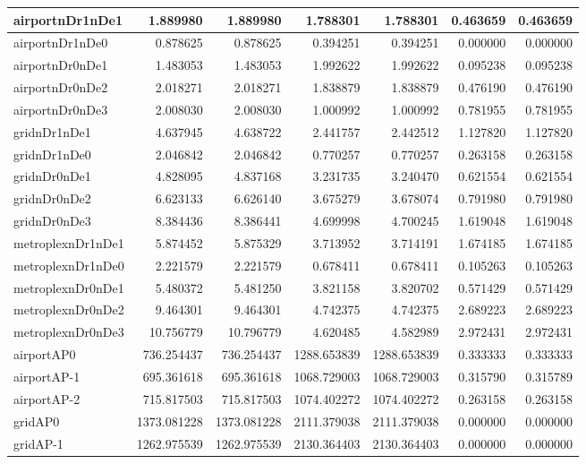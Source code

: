 \begin{longtable}{|l|r|r|r|r|r|r|}
\endlastfoot
airportnDr1nDe1 & 1.889980 & 1.889980 & 1.788301 & 1.788301 & 0.463659 & 0.463659 \\ \hline
airportnDr1nDe0 & 0.878625 & 0.878625 & 0.394251 & 0.394251 & 0.000000 & 0.000000 \\ \hline
airportnDr0nDe1 & 1.483053 & 1.483053 & 1.992622 & 1.992622 & 0.095238 & 0.095238 \\ \hline
airportnDr0nDe2 & 2.018271 & 2.018271 & 1.838879 & 1.838879 & 0.476190 & 0.476190 \\ \hline
airportnDr0nDe3 & 2.008030 & 2.008030 & 1.000992 & 1.000992 & 0.781955 & 0.781955 \\ \hline
gridnDr1nDe1 & 4.637945 & 4.638722 & 2.441757 & 2.442512 & 1.127820 & 1.127820 \\ \hline
gridnDr1nDe0 & 2.046842 & 2.046842 & 0.770257 & 0.770257 & 0.263158 & 0.263158 \\ \hline
gridnDr0nDe1 & 4.828095 & 4.837168 & 3.231735 & 3.240470 & 0.621554 & 0.621554 \\ \hline
gridnDr0nDe2 & 6.623133 & 6.626140 & 3.675279 & 3.678074 & 0.791980 & 0.791980 \\ \hline
gridnDr0nDe3 & 8.384436 & 8.386441 & 4.699998 & 4.700245 & 1.619048 & 1.619048 \\ \hline
metroplexnDr1nDe1 & 5.874452 & 5.875329 & 3.713952 & 3.714191 & 1.674185 & 1.674185 \\ \hline
metroplexnDr1nDe0 & 2.221579 & 2.221579 & 0.678411 & 0.678411 & 0.105263 & 0.105263 \\ \hline
metroplexnDr0nDe1 & 5.480372 & 5.481250 & 3.821158 & 3.820702 & 0.571429 & 0.571429 \\ \hline
metroplexnDr0nDe2 & 9.464301 & 9.464301 & 4.742375 & 4.742375 & 2.689223 & 2.689223 \\ \hline
metroplexnDr0nDe3 & 10.756779 & 10.796779 & 4.620485 & 4.582989 & 2.972431 & 2.972431 \\ \hline
airportAP0 & 736.254437 & 736.254437 & 1288.653839 & 1288.653839 & 0.333333 & 0.333333 \\ \hline
airportAP-1 & 695.361618 & 695.361618 & 1068.729003 & 1068.729003 & 0.315790 & 0.315789 \\ \hline
airportAP-2 & 715.817503 & 715.817503 & 1074.402272 & 1074.402272 & 0.263158 & 0.263158 \\ \hline
gridAP0 & 1373.081228 & 1373.081228 & 2111.379038 & 2111.379038 & 0.000000 & 0.000000 \\ \hline
gridAP-1 & 1262.975539 & 1262.975539 & 2130.364403 & 2130.364403 & 0.000000 & 0.000000 \\ \hline

\end{longtable}
